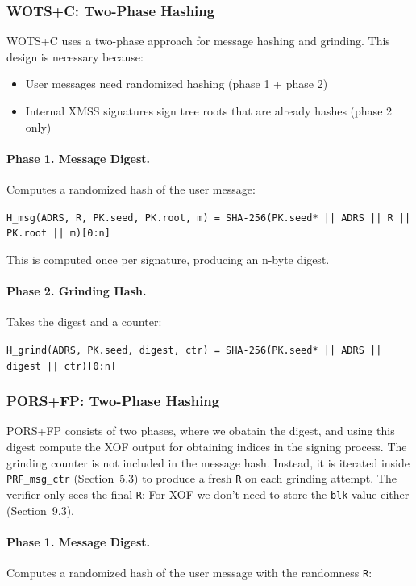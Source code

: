 \subsubsection{WOTS+C: Two-Phase Hashing}
WOTS+C uses a two-phase approach for message hashing and grinding. This design is necessary because:
\begin{itemize}
    \item User messages need randomized hashing (phase 1 + phase 2)
    \item Internal XMSS signatures sign tree roots that are already hashes (phase 2 only)
\end{itemize}

\paragraph{Phase 1. Message Digest.} Computes a randomized hash of the user message:
\begin{center}
    \texttt{H\_msg(ADRS, R, PK.seed, PK.root, m) = SHA-256(PK.seed* || ADRS || R || PK.root || m)[0:n]}
\end{center}
This is computed once per signature, producing an n-byte digest.

\paragraph{Phase 2. Grinding Hash.} Takes the digest and a counter:
\begin{center}
    \texttt{H\_grind(ADRS, PK.seed, digest, ctr) = SHA-256(PK.seed* || ADRS || digest || ctr)[0:n]}
\end{center}

\subsubsection{PORS+FP: Two-Phase Hashing}
PORS+FP consists of two phases, where we obatain the digest, and using this digest compute the XOF output for obtaining indices in the signing process.
The grinding counter is not included in the message hash. Instead, it is iterated inside \texttt{PRF\_msg\_ctr} (Section~5.3) to produce a fresh \texttt{R} on each grinding attempt. The verifier only sees the final \texttt{R}:
For XOF we don't need to store the \texttt{blk} value either (Section~9.3). 

\paragraph{Phase 1. Message Digest.} Computes a randomized hash of the user message with the randomness \texttt{R}:

